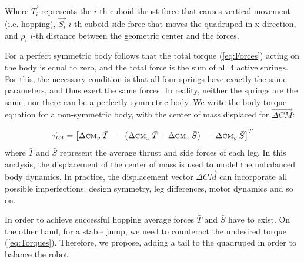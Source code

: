 Where $\vec{T_{i}}$ represents the $i$-th cuboid thrust force that causes vertical movement (i.e. hopping), $\vec{S_{i}}$ $i$-th cuboid side force that moves the quadruped in x direction, and $\rho _i$ $i$-th distance between the geometric center and the forces.

For a perfect symmetric body follows that the total torque (\ref{eq:Forces}) acting on the body is equal to zero, and the total force is the sum of all 4 active springs. For this, the necessary condition is that all four springs have exactly the same parameters, and thus exert the same forces. In reality, neither the springs are the same, nor there can be a perfectly symmetric body. We write the body torque equation for a non-symmetric body, with the center of mass displaced for $\vec{\Delta CM}$:

\begin{equation}\label{eq:Torques}
\vec{\tau}_{tot}=\begin{bmatrix}
\Delta \textsc{cm}_y \:\bar{T} & -\left ( \Delta \textsc{cm}_x \:\bar{T} +\Delta \textsc{cm}_z \:\bar{S}\right ) & -\Delta \textsc{cm}_y \:\bar{S}
\end{bmatrix}^T
\end{equation}
where $\bar{T}$ and $\bar{S}$ represent the average thrust and side forces of each leg. In this analysis, the displacement of the center of mass is used to model the unbalanced body dynamics. In practice, the displacement vector  $\vec{\Delta CM}$ can incorporate all possible imperfections: design symmetry, leg differences, motor dynamics and so on.  

In order to achieve successful hopping average forces $\bar{T}$ and $\bar{S}$ have to exist. On the other hand, for a stable jump, we need to counteract the undesired torque (\ref{eq:Torques}). Therefore, we propose, adding a tail to the quadruped in order to balance the robot. 
